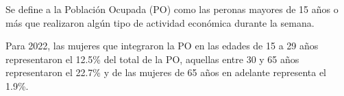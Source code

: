 Se define a la Población Ocupada (PO) como las peronas mayores de 15 años o más que realizaron algún tipo de actividad económica durante la semana. 

Para 2022, las mujeres que integraron la PO en las edades de 15 a 29 años representaron el 12.5\% del total de la PO, aquellas entre 30 y 65 años representaron el 22.7\% y de las mujeres de 65 años en adelante representa el 1.9\%.